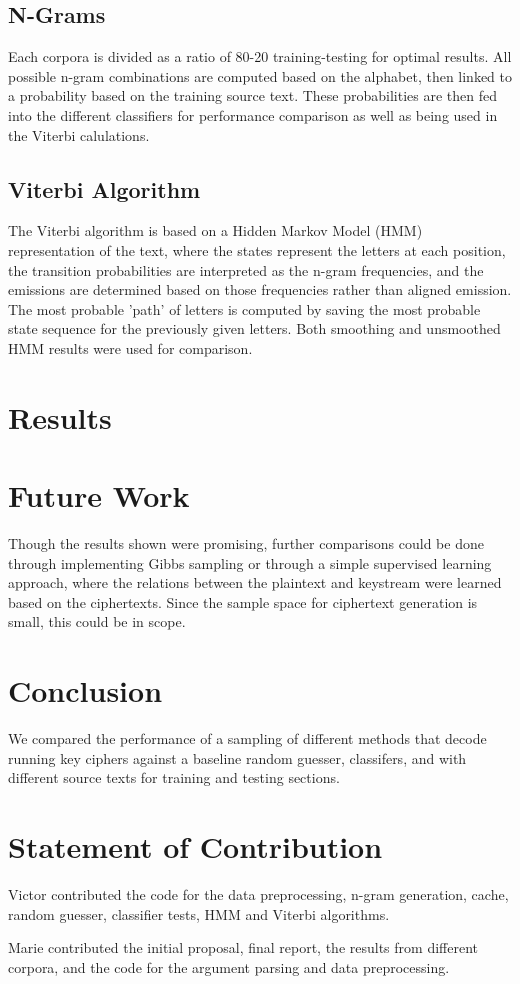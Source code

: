 \documentclass[11pt,letterpaper]{article}
\begin{document}
\subsection{N-Grams}
Each corpora is divided as a ratio of 80-20 training-testing for optimal results. All possible n-gram combinations are computed based on the alphabet, then linked to a probability based on the training source text. These probabilities are then fed into the different classifiers for performance comparison as well as being used in the Viterbi calulations.

\subsection{Viterbi Algorithm}
The Viterbi algorithm is based on a Hidden Markov Model (HMM) representation of the text, where the states represent the letters at each position, the transition probabilities are interpreted as the n-gram frequencies, and the emissions are determined based on those frequencies rather than aligned emission. The most probable 'path' of letters is computed by saving the most probable state sequence for the previously given letters. Both smoothing and unsmoothed HMM results were used for comparison.

\section{Results}

\section{Future Work}
Though the results shown were promising, further comparisons could be done through implementing Gibbs sampling or through a simple supervised learning approach, where the relations between the plaintext and keystream were learned based on the ciphertexts. Since the sample space for ciphertext generation is small, this could be in scope.

\section{Conclusion}
We compared the performance of a sampling of different methods that decode running key ciphers against a baseline random guesser, classifers, and with different source texts for training and testing sections. 

\section{Statement of Contribution}
Victor contributed the code for the data preprocessing, n-gram generation, cache, random guesser, classifier tests, HMM and Viterbi algorithms.

Marie contributed the initial proposal, final report, the results from different corpora, and the code for the argument parsing and data preprocessing.



\end{document}
